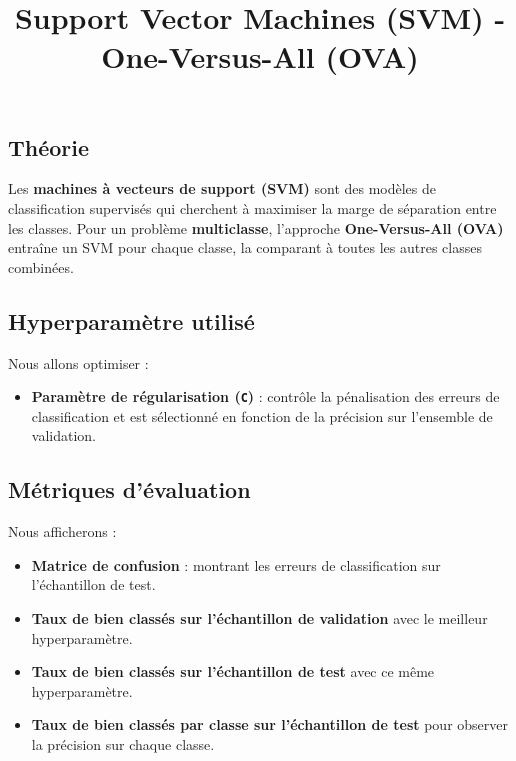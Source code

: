 \documentclass[
]{article}
\title{Support Vector Machines (SVM) - One-Versus-All (OVA)}
\author{}
\date{}
\providecommand{\tightlist}{%
  \setlength{\itemsep}{0pt}\setlength{\parskip}{0pt}}\usepackage{longtable,booktabs,array}
\begin{document}
\maketitle


\subsection{Théorie}\label{thuxe9orie}

Les \textbf{machines à vecteurs de support (SVM)} sont des modèles de
classification supervisés qui cherchent à maximiser la marge de
séparation entre les classes. Pour un problème \textbf{multiclasse},
l'approche \textbf{One-Versus-All (OVA)} entraîne un SVM pour chaque
classe, la comparant à toutes les autres classes combinées.

\subsection{Hyperparamètre utilisé}\label{hyperparamuxe8tre-utilisuxe9}

Nous allons optimiser :

\begin{itemize}
\tightlist
\item
  \textbf{Paramètre de régularisation (\texttt{C})} : contrôle la
  pénalisation des erreurs de classification et est sélectionné en
  fonction de la précision sur l'ensemble de validation.
\end{itemize}

\subsection{Métriques d'évaluation}\label{muxe9triques-duxe9valuation}

Nous afficherons :

\begin{itemize}
\item
  \textbf{Matrice de confusion} : montrant les erreurs de classification
  sur l'échantillon de test.
\item
  \textbf{Taux de bien classés sur l'échantillon de validation} avec le
  meilleur hyperparamètre.
\item
  \textbf{Taux de bien classés sur l'échantillon de test} avec ce même
  hyperparamètre.
\item
  \textbf{Taux de bien classés par classe sur l'échantillon de test}
  pour observer la précision sur chaque classe.
\end{itemize}
\end{document}
